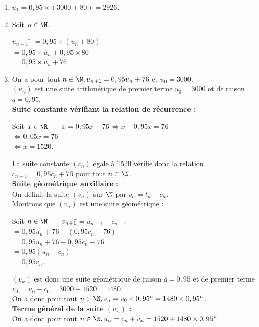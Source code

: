 \documentclass[a4paper,11pt,exos]{nsi} %
\begin{document}
\textcolor{UGLiBlue}{
    \begin{enumerate}
        \item $u_1=0,95\times (3000+80)=2926$.
        \item Soit $n\in\N$.
        \begin{tabbing}
            $u_{n+1}$ \= $=0,95\times (u_n+80)$\\
            \> $=0,95\times u_n+0,95\times 80$\\
            \> $=0,95\times u_n+76$
        \end{tabbing}
        \item On a pour tout $n\in\N, u_{n+1}=0,95 u_n+76$ et $u_0=3000$.\\
        $(u_n)$ est une suite arithmétique de premier terme $u_0=3000$ et de raison $q=0,95$.\\[.5em]
        \textbf{Suite constante vérifiant la relation de récurrence :} \begin{tabbing}
            Soit $x\in\R \qquad x=0,95x+76$\=$\iff x-0,95x=76$\\
            \>$\iff 0,05x=76$\\
            \>$\iff x=1520$.
        \end{tabbing}
        La suite constante $(c_n)$ égale à 1520 vérifie donc la relation $c_{n+1}=0,95c_n+76$ pour tout $n\in\N$.\\[.5em]
        \textbf{Suite géométrique auxiliaire :}\\[.5em]
        On définit la suite $(v_n)$ sur $\N$ par $v_n=t_n-c_n$.\\
        Montrons que $(v_n)$ est une suite géométrique :
        \begin{tabbing}
            Soit $n\in\N \qquad v_{n+1}$\=$=u_{n+1}-c_{n+1}$\\
            \> $=0,95u_n+76-(0,95c_n+76)$\\
            \> $=0,95u_n+76-0,95c_n-76$\\
            \> $=0,95(u_n-c_n)$\\
            \> $=0,95v_n$.
        \end{tabbing}
        $(v_n)$ est donc une suite géométrique de raison $q=0,95$ et de premier terme $v_0=u_0-c_0=3000-1520=1480$.\\
        On a donc pour tout $n\in\N, v_n=v_0\times 0,95^n=1480\times 0,95^n$.\\[.5em]
        \textbf{Terme général de la suite $(u_n)$ :}\\[.5em]
        On a donc pour tout $n\in\N, u_n=c_n+v_n=1520+1480\times 0,95^n$.

\end{enumerate}}
\end{document}
